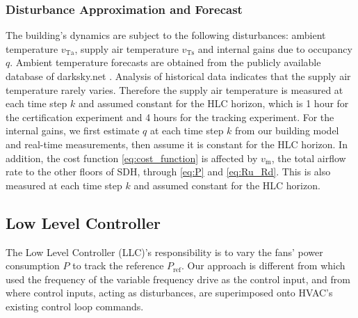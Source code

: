 \subsubsection{Disturbance Approximation and Forecast}
The building's dynamics are subject to the following disturbances: ambient temperature $v_{\text{Ta}}$, supply air temperature $v_{\text{Ts}}$ and internal gains due to occupancy $q$. 
Ambient temperature forecasts are obtained from the publicly available database of darksky.net \cite{darksky}. 
Analysis of historical data indicates that the supply air temperature rarely varies.
Therefore the supply air temperature is measured at each time step $k$ and assumed constant for the HLC horizon, which is 1 hour for the certification experiment and 4 hours for the tracking experiment.
For the internal gains, we first estimate $q$ at each time step $k$ from our building model and real-time measurements, then assume it is constant for the HLC horizon.
In addition, the cost function \eqref{eq:cost_function} is affected by $v_{\dot{\text{m}}}$, the total airflow rate to the other floors of SDH, through \eqref{eq:P} and \eqref{eq:Ru_Rd}. This is also measured at each time step $k$ and assumed constant for the HLC horizon.






\subsection{Low Level Controller}\label{sec:llc}

The Low Level Controller (LLC)'s responsibility is to vary the fans' power consumption $P$ to track the reference $P_{\text{ref}}$. 
Our approach is different from \cite{Macdonald:2014pjm} which used the frequency of the variable frequency drive as the control input, and from \cite{Lin:2015exp} where control inputs, acting as disturbances, are superimposed onto HVAC's existing control loop commands.

